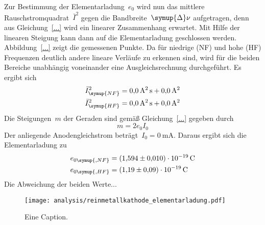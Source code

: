 Zur Bestimmung der Elementarladung~$e_0$ wird nun das mittlere
Rauschstromquadrat~$\bar{I}^2$ gegen die Bandbreite~$\symup{\Delta}\nu$
aufgetragen, denn aus Gleichung~\eqref{...} wird ein linearer Zusammenhang
erwartet. Mit Hilfe der linearen Steigung kann dann auf die Elementarladung
geschlossen werden. Abbildung~\ref{...} zeigt die gemessenen Punkte. Da für
niedrige (NF) und hohe (HF) Frequenzen deutlich andere lineare Verläufe zu
erkennen sind, wird für die beiden Bereiche unabhängig voneinander eine
Ausgleichsrechnung durchgeführt. Es ergibt sich
%
\begin{align}
    \bar{I}^2_{\symup{NF}}&=\SI{0.0(0)}{\ampere\squared\second}+\SI{0.0(0)}{\ampere\squared} \\
    \bar{I}^2_{\symup{HF}}&=\SI{0.0(0)}{\ampere\squared\second}+\SI{0.0(0)}{\ampere\squared}
\end{align}
%
Die Steigungen~$m$ der Geraden sind gemäß Gleichung~\eqref{...} gegeben durch
%
\begin{equation}
  m=2e_0I_0
\end{equation}
%
Der anliegende Anodengleichstrom beträgt~$I_0=\SI{0}{\milli\ampere}$. Daraus
ergibt sich die Elementarladung zu
%
\begin{align}
  e_{0\symup{, NF}}&=\SI{1.594(10)e-19}{\coulomb} \\
  e_{0\symup{, HF}}&=\SI{1.19(9)e-19}{\coulomb}
\end{align}
%
Die Abweichung der beiden Werte...

\begin{figure}
  \texttt{[image: analysis/reinmetallkathode\_elementarladung.pdf]}
  \caption{Eine Caption.}
  \label{fig:reinmetallkathode_elementarladung}
\end{figure}
